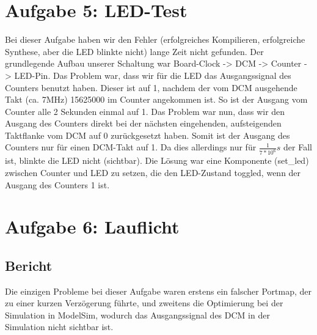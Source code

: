 \documentclass[parskip=full]{scrartcl}
\begin{document}
	\section*{Aufgabe 5: LED-Test}
		\setcounter{section}{5}
		\setcounter{subsection}{0}
		Bei dieser Aufgabe haben wir den Fehler (erfolgreiches Kompilieren, erfolgreiche Synthese, aber die LED blinkte nicht) lange Zeit nicht gefunden. Der grundlegende Aufbau unserer Schaltung war Board-Clock -> DCM -> Counter -> LED-Pin. Das Problem war, dass wir für die LED das Ausgangssignal des Counters benutzt haben. Dieser ist auf 1, nachdem der vom DCM ausgehende Takt (ca. 7MHz) 15625000 im Counter angekommen ist. So ist der Ausgang vom Counter alle 2 Sekunden einmal auf 1. Das Problem war nun, dass wir den Ausgang des Counters direkt bei der nächsten eingehenden, aufsteigenden Taktflanke vom DCM auf 0 zurückgesetzt haben. Somit ist der Ausgang des Counters nur für einen DCM-Takt auf 1. Da dies allerdings nur für $\frac{1}{7*10^6}s$ der Fall ist, blinkte die LED nicht (sichtbar). Die Lösung war eine Komponente (set\_led) zwischen Counter und LED zu setzen, die den LED-Zustand toggled, wenn der Ausgang des Counters 1 ist.
	\section*{Aufgabe 6: Lauflicht}
		\subsection{Bericht}
			Die einzigen Probleme bei dieser Aufgabe waren erstens ein falscher Portmap, der zu einer kurzen Verzögerung führte, und zweitens die Optimierung bei der Simulation in ModelSim, wodurch das Ausgangssignal des DCM in der Simulation nicht sichtbar ist.
			
\end{document}
